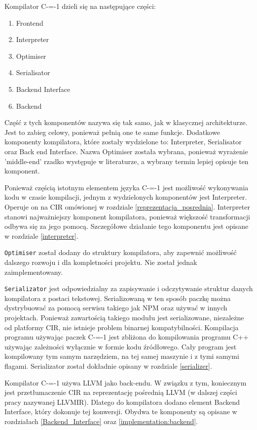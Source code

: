 Kompilator C-=-1 dzieli się na następujące części:
\begin{enumerate}
    \item Frontend
    \item Interpreter
    \item Optimiser
    \item Serialisator
    \item Backend Interface
    \item Backend
\end{enumerate}
Część z tych komponentów nazywa się tak samo, jak w klasycznej architekturze. Jest to zabieg celowy, ponieważ pełnią one te same funkcje. 
Dodatkowe komponenty kompilatora, które zostały wydzielone to: Interpreter, Serialisator oraz Back end Interface.
Nazwa Optimiser została wybrana, ponieważ wyrażenie 'middle-end' rzadko występuje w literaturze, a wybrany termin lepiej opisuje ten komponent.

Ponieważ częścią istotnym elementem języka C-=-1 jest możliwość wykonywania kodu w czasie kompilacji, jednym z wydzielonych komponentów jest Interpreter.
Operuje on na CIR omówionej w rozdziale \ref{reprezentacja_posrednia}. Interpreter stanowi najważniejszy komponent kompilatora, ponieważ większość transformacji odbywa się za jego pomocą. Szczegółowe działanie tego komponentu jest opisane w rozdziale \ref{interpreter}.

\lstinline{Optimiser} został dodany do struktury kompilatora, aby zapewnić możliwość dalszego rozwoju i dla kompletności projektu. Nie został jednak zaimplementowany.

\lstinline{Serializator} jest odpowiedzialny za zapisywanie i odczytywanie struktur danych kompilatora z postaci tekstowej.
Serializowaną w ten sposób paczkę można dystrybuować za pomocą serwisu takiego jak NPM oraz używać w innych projektach.
Ponieważ zawartością takiego modułu jest serializowane, niezależne od platformy CIR, nie istnieje problem binarnej kompatybilności.
Kompilacja programu używając paczek C-=-1 jest zbliżona do kompilowania programu C++ używając zależności wyłącznie w formie kodu źródłowego.
Cały program jest kompilowany tym samym narzędziem, na tej samej maszynie i z tymi samymi flagami. Serializator został dokładnie opisany w rozdziale \ref{serializer}.

Kompilator C-=-1 używa LLVM jako back-endu. W związku z tym, koniecznym jest przetłumaczenie CIR na reprezentację pośrednią LLVM (w dalszej części pracy nazywanej LLVMIR). Dlatego do kompilatora dodano element Backend Interface, który dokonuje tej konwersji. Obydwa te komponenty są opisane w rozdziałach \ref{Backend_Interface} oraz \ref{implementation:backend}.

